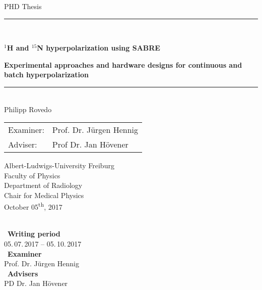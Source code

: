 
\begin{titlepage}
\begin{center}

\newcommand{\HorizontalLine}{\rule{\linewidth}{0.3mm}}

{\Large PHD Thesis}\\[1.3cm]


\HorizontalLine \\[0.4cm]
\begin{spacing}{3}
    {\huge \bfseries $^1$H and $^{15}$N hyperpolarization using SABRE} \\
\end{spacing}
\begin{spacing}{2}
    {\Large \bfseries Experimental approaches and hardware designs for continuous and batch hyperpolarization}\\
\end{spacing}
\HorizontalLine \\[1.5cm]


	{\Huge Philipp Rovedo} \\[2cm]


\begin{tabular}[hc]{>{\huge}l >{\huge}l}
  Examiner: & Prof. Dr. J\"urgen Hennig \\[0.3cm]
  Adviser: & Prof Dr. Jan H\"ovener \\[1.2cm]
\end{tabular}
\vfill  %

\Large {
    Albert-Ludwigs-University Freiburg\\
    Faculty of Physics\\
    Department of Radiology\\
    Chair for Medical Physics\\[1cm]

    October 05\textsuperscript{th}, 2017\\
}
\end{center}
\end{titlepage}

\ \vfill \ \\  %
\
\textbf{Writing period}            \smallskip{} \\
05.\,07.\,2017 -- 05.\,10.\,2017   \bigskip{} \\
\
\textbf{Examiner}                  \smallskip{} \\
Prof. Dr. J\"urgen Hennig               \bigskip{} \\
\
\textbf{Advisers}                  \smallskip{} \\
PD Dr. Jan H\"ovener
